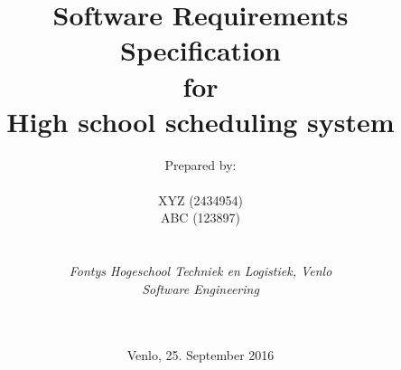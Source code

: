
\def\Company{Consultancy}
\def\Institute{\textit{Fontys Hogeschool Techniek en Logistiek, Venlo}}
\def\Course{\textit{Software Engineering}}
\def\Module{\textit{ }}
\def\Docent{\textit{}}
\def\Assistant{\textit{}}

\def\BoldTitle{Software Requirements Specification}

\def\Subtitle{for \\ High school scheduling system \\}
\def\Authors{Prepared by:\\\\ XYZ (2434954) \\ ABC (123897) } 
\def\Shortname{A.Sandu}


\title{\textbf{\BoldTitle}\\\Subtitle}
\author{\Authors \\ \\ \\ \Institute\\ \Course\\ \Module\\ \Docent\\ \Assistant}
\date{Venlo, 25. September 2016}

